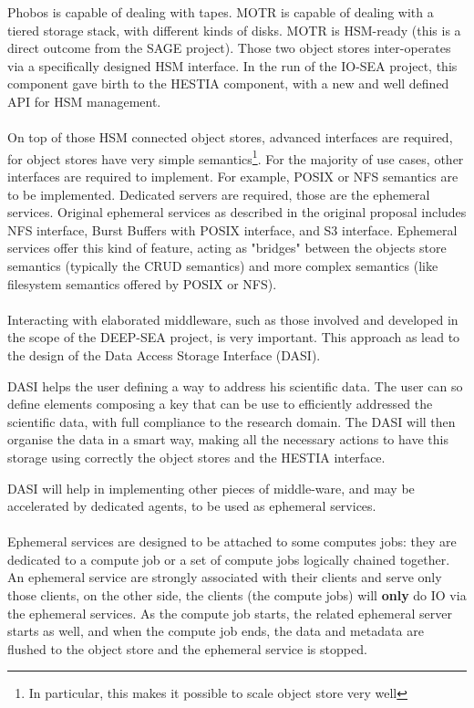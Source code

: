 Phobos is capable of dealing with tapes. MOTR is capable of dealing with a tiered storage stack, with
different kinds of disks. MOTR is HSM-ready (this is a direct outcome from the SAGE project). Those two object
stores inter-operates via a specifically designed HSM interface. In the run of the IO-SEA project, this component
gave birth to the HESTIA component, with a new and well defined API for HSM management.

\paragraph{}
On top of those HSM connected object stores, advanced interfaces are required, for object stores have very 
simple semantics\footnote{In particular, this makes it possible to scale object store very well}. For the 
majority of use cases, other interfaces are required to implement. For example, POSIX or NFS semantics are to 
be implemented. Dedicated servers are required, those are the ephemeral services. Original ephemeral services as
described in the original proposal includes NFS interface, Burst Buffers with POSIX interface, and S3 interface.
Ephemeral services offer this kind of feature, acting as "bridges" between the objects store semantics (typically
the CRUD semantics) and more complex semantics (like filesystem semantics offered by POSIX or NFS). 

\paragraph{}
Interacting with elaborated middleware, such as those involved and developed in the scope of the DEEP-SEA 
project, is very important. This approach as lead to the design of the Data Access Storage Interface (DASI).

DASI helps the user defining a way to address his scientific data. The user can so define elements composing a 
key that can be use to efficiently addressed the scientific data, with full compliance to the research domain. 
The DASI will then organise the data in a smart way, making all the necessary actions to have this storage
using correctly the object stores and the HESTIA interface. 

DASI will help in implementing other pieces of middle-ware, and may be accelerated by dedicated agents, to be
used as ephemeral services. 

\paragraph{}
Ephemeral services are designed to be attached to some computes jobs: they are dedicated to a compute job or a
set of compute jobs logically chained together. An ephemeral service are strongly associated with their clients
and serve only those clients, on the other side, the clients (the compute jobs) will \textbf{only} do IO via
the ephemeral services. As the compute job starts, the related ephemeral server starts as well, and when the 
compute job ends, the data and metadata are flushed to the object store and the ephemeral service is stopped.

